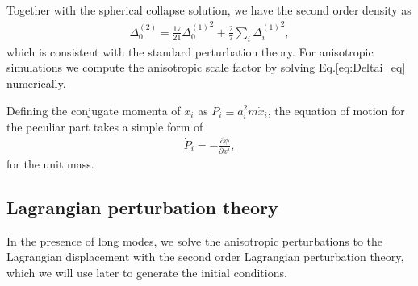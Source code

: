 \documentclass[a4paper,11pt]{article}
\begin{document}
Together with the spherical collapse solution, we have the second order density as
\begin{align}
\Delta_0^{(2)} =
\frac{17}{21} {\Delta_0^{(1)}}^2 + \frac27 \sum_i {\Delta_i^{(1)}}^2,
\end{align}
which is consistent with the standard perturbation theory.
For anisotropic simulations we compute the anisotropic scale factor
by solving Eq.\eqref{eq:Deltai_eq} numerically.

Defining the conjugate momenta of $x_{i}$ as $P_{i}\equiv a_i^2 m \dot x_{i}$,
the equation of motion for the peculiar part takes a simple form of
\begin{align}
    \dot P_{i} = - \frac{\partial \phi}{\partial x^i},
    \label{eq:mod_EoM}
\end{align}
for the unit mass.



\subsection{Lagrangian perturbation theory}
\label{sub:lpt}

In the presence of long modes, we solve the anisotropic perturbations to the
Lagrangian displacement with the second order Lagrangian perturbation theory,
which we will use later to generate the initial conditions.
\end{document}
